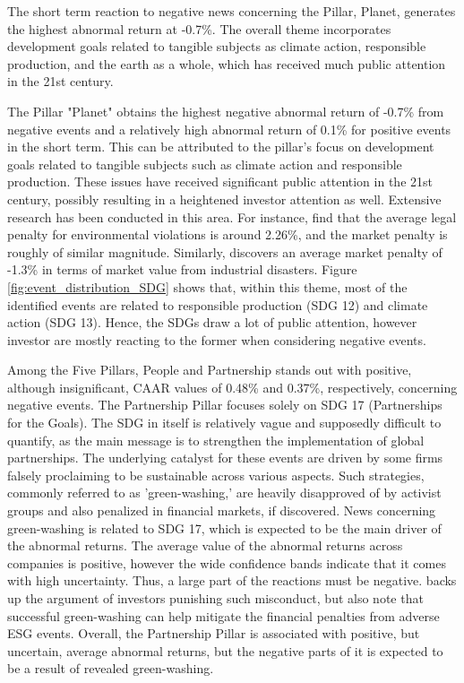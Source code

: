 The short term reaction to negative news concerning the Pillar, Planet, generates the highest abnormal return at -0.7\%. The overall theme incorporates development goals related to tangible subjects as climate action, responsible production, and the earth as a whole, which has received much public attention in the 21st century.

The Pillar "Planet" obtains the highest negative abnormal return of -0.7\% from negative events and a relatively high abnormal return of 0.1\% for positive events in the short term. This can be attributed to the pillar's focus on development goals related to tangible subjects such as climate action and responsible production. These issues have received significant public attention in the 21st century, possibly resulting in a heightened investor attention as well. Extensive research has been conducted in this area. For instance, \cite{karpoff2005reputational} find that the average legal penalty for environmental violations is around 2.26\%, and the market penalty is roughly of similar magnitude. Similarly, \cite{capelle2010does} discovers an average market penalty of -1.3\% in terms of market value from industrial disasters. Figure \ref{fig:event_distribution_SDG} shows that, within this theme, most of the identified events are related to responsible production (SDG 12) and climate action (SDG 13). Hence, the SDGs draw a lot of public attention, however investor are mostly reacting to the former when considering negative events. 

Among the Five Pillars, People and Partnership stands out with positive, although insignificant, CAAR values of 0.48\% and 0.37\%, respectively, concerning negative events.
The Partnership Pillar focuses solely on SDG 17 (Partnerships for the Goals). The SDG in itself is relatively vague and supposedly difficult to quantify, as the main message is to strengthen the implementation of global partnerships. The underlying catalyst for these events are driven by some firms falsely proclaiming to be sustainable across various aspects. Such strategies, commonly referred to as 'green-washing,' are heavily disapproved of by activist groups and also penalized in financial markets, if discovered. News concerning green-washing is related to SDG 17, which is expected to be the main driver of the abnormal returns. The average value of the abnormal returns across companies is positive, however the wide confidence bands indicate that it comes with high uncertainty. Thus, a large part of the reactions must be negative.  \cite{Blancard_ESG_sentiment} backs up the argument of investors punishing such misconduct, but also note that successful green-washing can help mitigate the financial penalties from adverse ESG events. Overall, the Partnership Pillar is associated with positive, but uncertain, average abnormal returns, but the negative parts of it is expected to be a result of revealed green-washing. 

